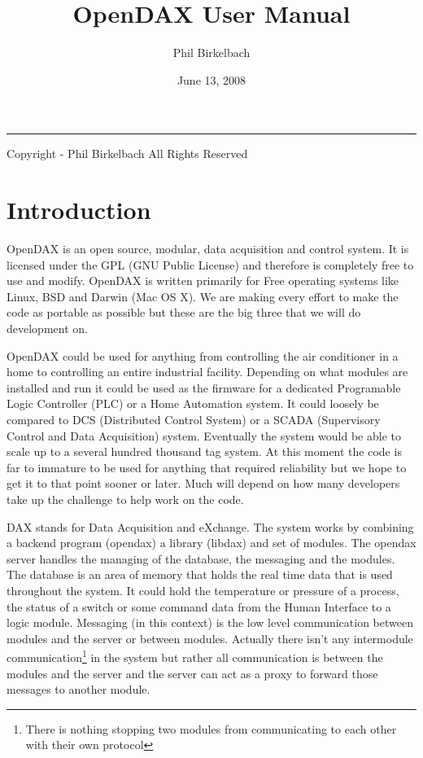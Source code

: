 \documentclass[10pt,letterpaper]{report}
\title{OpenDAX User Manual}
\date{June 13, 2008}
\author{Phil Birkelbach}
\makeatletter
\renewcommand{\maketitle}{\begin{titlepage}%
    \let\footnotesize\small
    \let\footnoterule\relax
    \parindent \z@
    \reset@font
    \null\vfil
    \begin{flushleft}
      \huge \@title
    \end{flushleft}
    \par
    \hrule height 1pt
    \par
    \begin{flushright}
      \LARGE \@author \par
    \end{flushright}
    \vskip 60\p@
    \vfil\null
  \end{titlepage}%
  \setcounter{footnote}{0}%
}
\makeatother
\begin{document}
\begin{titlepage}
\maketitle

\begin{flushleft}
Copyright  - Phil Birkelbach\linebreak
All Rights Reserved
\end{flushleft}

\end{titlepage}
\tableofcontents
\newpage

\chapter{Introduction}
OpenDAX is an open source, modular, data acquisition and control system. It is licensed under the GPL (GNU Public License) and therefore is completely free to use and modify. OpenDAX is written primarily for Free operating systems like Linux, BSD and Darwin (Mac OS X). We are making every effort to make the code as portable as possible but these are the big three that we will do development on.

OpenDAX could be used for anything from controlling the air conditioner in a home to controlling an entire industrial facility. Depending on what modules are installed and run it could be used as the firmware for a dedicated Programable Logic Controller (PLC) or a Home Automation system. It could loosely be compared to DCS (Distributed Control System) or a SCADA (Supervisory Control and Data Acquisition) system. Eventually the system would be able to scale up to a several hundred thousand tag system. At this moment the code is far to immature to be used for anything that required reliability but we hope to get it to that point sooner or later. Much will depend on how many developers take up the challenge to help work on the code.

DAX stands for Data Acquisition and eXchange. The system works by combining a backend program (opendax) a library (libdax) and set of modules. The opendax server handles the managing of the database, the messaging and the modules.  The database is an area of memory that holds the real time data that is used throughout the system.  It could hold the temperature or pressure of a process, the status of a switch or some command data from the Human Interface to a logic module.  Messaging (in this context) is the low level communication between modules and the server or between modules.  Actually there isn't any intermodule communication\footnote{There is nothing stopping two modules from communicating to each other with their own protocol} in the system but rather all communication is between the modules and the server and the server can act as a proxy to forward those messages to another module.
\end{document}
